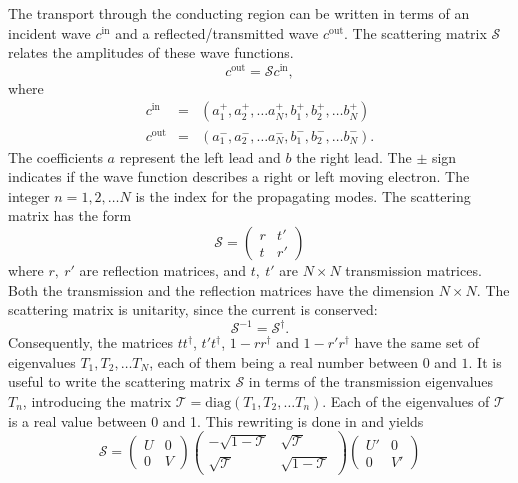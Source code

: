 The transport through the conducting region can be written in terms of an incident wave $c^\text{in}$ and a reflected/transmitted wave $c^\text{out}$. The scattering matrix $\mathcal{S}$ relates the amplitudes of these wave functions.
\begin{equation}
c^{\text{out}} = \mathcal{S} c^{\text{in}},
\end{equation}
where
\begin{eqnarray}
c^\text{in} &=& \left( a_1^+, a_2^+, \dots a_N^+, b_1^+, b_2^+, \dots b_N^+ \right) \\
c^\text{out} &=& \left( a_1^-, a_2^-, \dots a_N^-, b_1^-, b_2^-, \dots b_N^- \right).
\end{eqnarray}
The coefficients $a$ represent the left lead and $b$ the right lead. The $\pm$ sign indicates if the wave function describes a right or left moving electron. The integer $n = 1, 2, \dots N$ is the index for the propagating modes. %
The scattering matrix has the form
\begin{equation}
\mathcal{S} = \begin{pmatrix} r & t' \\ t & r'\end{pmatrix}
\end{equation}
where $r,\ r'$ are reflection matrices, and $t,\ t'$ are $N \times N $ transmission matrices. Both the transmission and the reflection matrices have the dimension $N \times N$. The scattering matrix is unitarity, since the current is conserved:
\begin{equation}
\mathcal{S}^{-1} = \mathcal{S}^\dagger.
\end{equation}
Consequently, the matrices $tt^\dagger$, $t't^\dagger$, $1-rr^\dagger$ and $1-r'r^\dagger$ have the same set of eigenvalues $T_1, T_2, \dots T_N$, each of them being a real number between $0$ and $1$.
It is useful to write the scattering matrix $\mathcal{S}$ in terms of the transmission eigenvalues $T_n$, introducing the matrix $\mathcal{T} = \text{diag} ( T_1, T_2, \dots T_n )$. Each of the eigenvalues of $\mathcal{T}$ is a real value between 0 and 1. This rewriting is done in \cite{Mello1988} and yields
\begin{equation}
\mathcal{S} = \begin{pmatrix} U & 0 \\ 0 & V\end{pmatrix} \begin{pmatrix} - \sqrt{1 - \mathcal{T}} & \sqrt{\mathcal{T}} \\ \sqrt{\mathcal{T}}& \sqrt{1 - \mathcal{T}} \end{pmatrix} \begin{pmatrix} U' & 0 \\ 0 & V' \end{pmatrix}
\end{equation}
